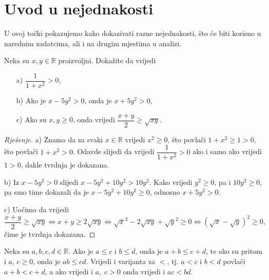 \section{Uvod u nejednakosti}
U ovoj točki pokazujemo kako dokazivati razne nejednakosti, što će biti korisno u narednim zadatcima, ali i na drugim mjestima u analizi.
\begin{exercise}
\label{25}
Neka su $x, y\in \mathbb{R}$ proizvoljni. Dokažite da vrijedi
\begin{itemize}
\item[a)] $\dfrac{1}{1+x^2}>0$,
\item[b)] Ako je $x-5y^2>0$, onda je $x+5y^2>0$,
\item[c)] Ako su $x, y\geq 0$, onda vrijedi $\dfrac{x+y}{2}\geq \sqrt{xy}$.
\end{itemize}
\end{exercise}
\begin{proof}[Rješenje]
a) Znamo da za svaki $x\in \mathbb{R}$ vrijedi $x^2\geq 0$, što povlači $1+x^2\geq 1>0$, što povlači $1+x^2>0$. Odavde slijedi da vrijedi $\dfrac{1}{1+x^2}>0$ ako i samo ako vrijedi $1>0$, dakle tvrdnja je dokazana.

b) Iz $x-5y^2>0$ slijedi $x-5y^2+10y^2>10y^2$. Kako vrijedi $y^2\geq 0$, pa i $10y^2\geq 0$, pa smo time dokazali da je $x-5y^2+10y^2\geq 0$, odnosno $x+5y^2>0$.

c) Uočimo da vrijedi
$$\dfrac{x+y}{2}\geq \sqrt{xy}\Leftrightarrow x+y\geq 2\sqrt{xy}\Leftrightarrow \sqrt{x}^2-2\sqrt{xy}+\sqrt{y}^2\geq 0\Leftrightarrow \left(\sqrt{x}-\sqrt{y}\right)^2\geq 0,$$
čime je tvrdnja dokazana.
\end{proof}
\begin{remark}
\label{10}
Neka su $a, b, c, d\in \mathbb{R}$. Ako je $a\leq c$ i $b\leq d$, onda je $a+b\leq c+d$, te ako su pritom i $a$, $c\geq 0$, onda je $ab\leq cd$. Vrijedi i varijanta za $<$, tj. $a<c$ i $b<d$ povlači $a+b<c+d$, a ako vrijedi i $a,\;c> 0$ onda vrijedi i $ac<bd$.
\end{remark}

